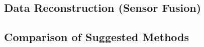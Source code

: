 \documentclass[Main]{subfiles}
\begin{document}
	

	\subsection{Data Reconstruction (Sensor Fusion)} %
	\label{sub:data_reconstruction}
	

	
	\subsection{Comparison of Suggested Methods} %
	\label{sub:comparison_of_suggested_methods}

	

\end{document}
